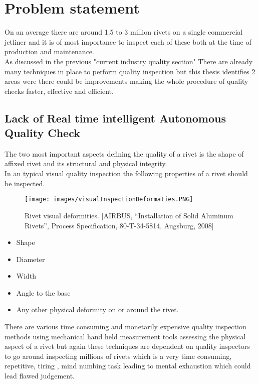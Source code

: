 \documentclass{article}
\begin{document}
\section{Problem statement}

On an average there are around 1.5 to 3 million rivets on a single commercial jetliner and it is of most importance to inspect each of these both at the time of production and maintenance.\\

As discussed in the previous "current industry quality section" There are already many techniques in place to perform quality inspection but this thesis identifies 2 areas were there could be improvements making the whole procedure of quality checks faster, effective and efficient.

\subsection{Lack of Real time intelligent Autonomous Quality Check }

The two most important aspects defining the quality of a rivet is the shape of affixed rivet and its structural and physical integrity.\\
In an typical visual quality inspection the following properties of a rivet should be inspected.

\begin{figure}[htp]
    \centering
    \texttt{[image: images/visualInspectionDeformaties.PNG]}
    \caption{Rivet visual deformities. [AIRBUS, “Installation of Solid Aluminum Rivets”, Process Specification, 80-T-34-5814, Augsburg, 2008]}
    \label{fig:Visual inspecton deformaties}
\end{figure}

    \begin{itemize}
        \item Shape
        \item Diameter
        \item Width
        \item Angle to the base
        \item Any other physical deformity on or around the rivet.
    \end{itemize}



There are various time consuming and monetarily expensive quality inspection methods using mechanical hand held measurement tools assessing the physical aspect of a rivet but again these techniques are dependent on quality inspectors to go around inspecting millions of rivets which is a very time consuming, repetitive, tiring , mind numbing task leading to mental exhaustion which could lead flawed judgement.
\end{document}
